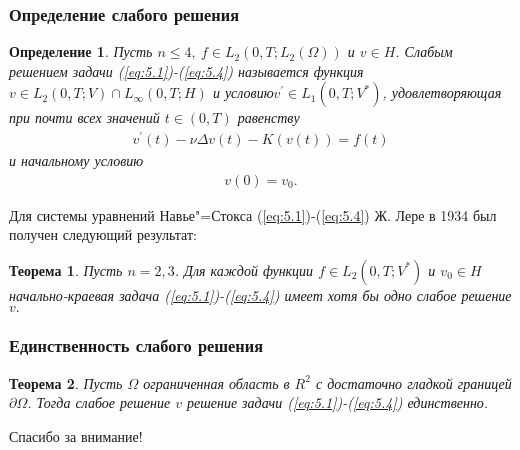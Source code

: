 \documentclass[10pt, pdf, hyperref={unicode}]{beamer}
\newtheorem{ru_theo}{Теорема}
\renewenvironment{theorem}{\begin{ru_theo}}{\end{ru_theo}}
\newtheorem{ru_def}{Определение}
\renewenvironment{definition}{\begin{ru_def}}{\end{ru_def}}
\begin{document}
  \begin{frame}
    \frametitle{Определение слабого решения}
    \begin{center}
      \begin{minipage}[h]{0.97\linewidth}
        \begin{definition}
          Пусть $n \le 4, \ f \in L_2(0, T; L_2(\Omega))$ и $v \in H$. Слабым решением задачи (\ref{eq:5.1})-(\ref{eq:5.4}) называется функция
          $v \in L_2(0, T; V)\cap L_{\infty}(0,T;H)$ и условию$ v^{\prime}\in L_1(0, T; V^\ast)$,
          удовлетворяющая при почти всех значений $t \in (0, T)$ равенству 
          \begin{equation}\label{eq:5.11}
              \begin{gathered}
                v^\prime(t) - \nu\Delta v(t) - K(v(t)) = f(t)
              \end{gathered}
          \end{equation}
          и начальному условию
          \begin{equation}\label{eq:5.12}
              \begin{gathered}
                v(0) = v_0.
              \end{gathered}
          \end{equation}
        \end{definition}
        Для системы уравнений Навье"=Стокса (\ref{eq:5.1})-(\ref{eq:5.4}) Ж. Лере в 1934 был получен следующий результат:
        \begin{theorem}
          Пусть $n=2,3$. Для каждой функции $f\in L_2(0,T;V^\ast)$ и $v_0\in H$ начально-краевая задача (\ref{eq:5.1})-(\ref{eq:5.4})
          имеет хотя бы одно слабое решение $v.$
        \end{theorem}
      \end{minipage}
    \end{center}
  \end{frame}


    \begin{frame}
    \frametitle{Единственность слабого решения}
    \begin{center}
      \begin{minipage}[h]{0.97\linewidth}
        \begin{theorem}
          Пусть $\Omega$ ограниченная область в $R^2$ с достаточно гладкой границей $\partial\Omega$. Тогда слабое решение $v$  решение
          задачи (\ref{eq:5.1})-(\ref{eq:5.4}) единственно.
        \end{theorem}
      \end{minipage}
    \end{center}
  \end{frame}


  \begin{frame}
    \begin{alertblock}{}
      \centerline{\large Спасибо за внимание!}
    \end{alertblock}
  \end{frame}
\end{document}
